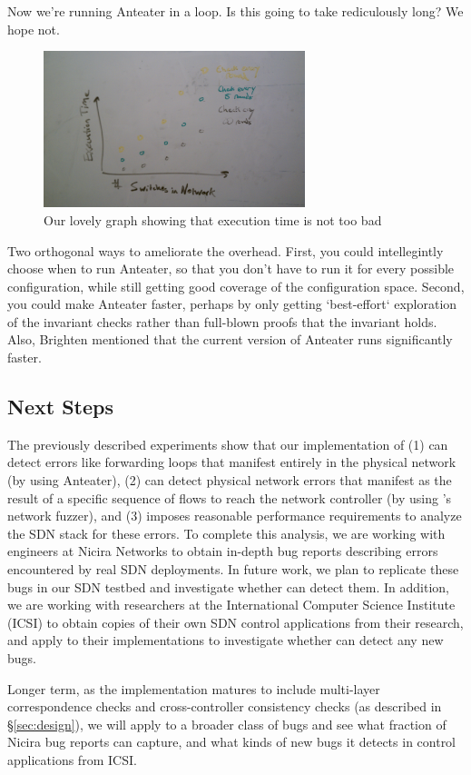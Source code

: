     Now we're running Anteater in a
    loop. Is this going to take rediculously long? We hope not.

    \begin{figure}[t]
        \centering
        \includegraphics[width=3in]{../graphs/mock_overhead_graph.jpg}
        \caption[]{\label{fig:loop} Our lovely graph showing that execution time
        is not too bad\vspace{-10pt}} 
    \end{figure}

    Two orthogonal ways to ameliorate the overhead. First, you could intellegintly choose
    when to run Anteater, so that you don't have to run it for every possible
    configuration, while still getting good coverage of the
    configuration space. Second, you could make Anteater faster, perhaps by only
    getting `best-effort` exploration of the invariant checks rather than
    full-blown proofs that the invariant holds. Also, Brighten mentioned that the
    current version of Anteater runs significantly faster.

    \subsection{Next Steps}
        The previously described experiments show that our implementation of \projectname{} (1) can detect errors like forwarding loops that manifest entirely in the physical network (by using Anteater), (2) can detect physical network errors that manifest as the result of a specific sequence of flows to reach the network controller (by using \projectname{}'s network fuzzer), and (3) imposes reasonable performance requirements to analyze the SDN stack for these errors.
        To complete this analysis, we are working with engineers at Nicira Networks to obtain in-depth bug reports describing errors encountered by real SDN deployments.
        In future work, we plan to replicate these bugs in our SDN testbed and investigate whether \projectname{} can detect them.
        In addition, we are working with researchers at the International Computer Science Institute (ICSI) to obtain copies of their own SDN control applications from their research, and apply \projectname{} to their implementations to investigate whether \projectname{} can detect any new bugs.

        Longer term, as the \projectname{} implementation matures to include multi-layer correspondence checks and cross-controller consistency checks (as described in \S\ref{sec:design}), we will apply \projectname{} to a broader class of bugs and see what fraction of Nicira bug reports \projectname{} can capture, and what kinds of new bugs it detects in control applications from ICSI. 


